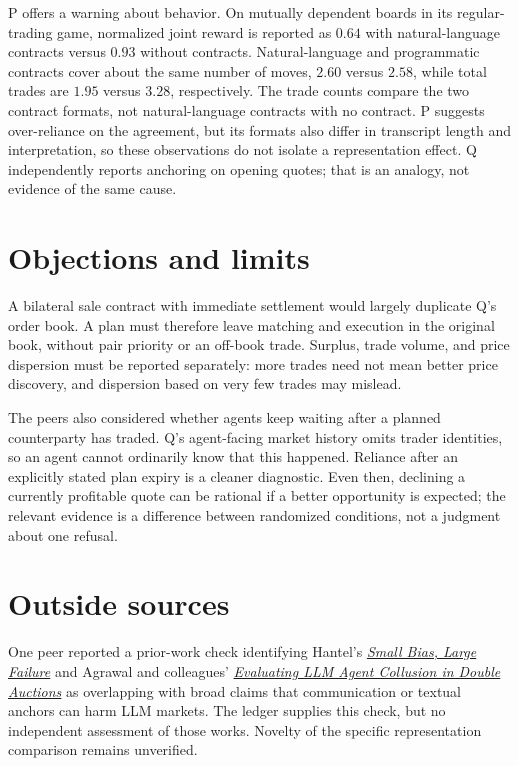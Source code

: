 \documentclass{article}
\begin{document}
P offers a warning about behavior. On mutually dependent boards in its regular-trading game, normalized joint reward is reported as \(0.64\) with natural-language contracts versus \(0.93\) without contracts. Natural-language and programmatic contracts cover about the same number of moves, \(2.60\) versus \(2.58\), while total trades are \(1.95\) versus \(3.28\), respectively. The trade counts compare the two contract formats, not natural-language contracts with no contract. P suggests over-reliance on the agreement, but its formats also differ in transcript length and interpretation, so these observations do not isolate a representation effect. Q independently reports anchoring on opening quotes; that is an analogy, not evidence of the same cause. 

\section*{Objections and limits}

A bilateral sale contract with immediate settlement would largely duplicate Q's order book. A plan must therefore leave matching and execution in the original book, without pair priority or an off-book trade. Surplus, trade volume, and price dispersion must be reported separately: more trades need not mean better price discovery, and dispersion based on very few trades may mislead. 

The peers also considered whether agents keep waiting after a planned counterparty has traded. Q's agent-facing market history omits trader identities, so an agent cannot ordinarily know that this happened. Reliance after an explicitly stated plan expiry is a cleaner diagnostic. Even then, declining a currently profitable quote can be rational if a better opportunity is expected; the relevant evidence is a difference between randomized conditions, not a judgment about one refusal. 

\section*{Outside sources}

One peer reported a prior-work check identifying Hantel's \href{https://papers.ssrn.com/sol3/papers.cfm?abstract_id=7095458}{\emph{Small Bias, Large Failure}} and Agrawal and colleagues' \href{https://arxiv.org/abs/2507.01413}{\emph{Evaluating LLM Agent Collusion in Double Auctions}} as overlapping with broad claims that communication or textual anchors can harm LLM markets. The ledger supplies this check, but no independent assessment of those works. Novelty of the specific representation comparison remains unverified. 
\end{document}
